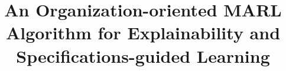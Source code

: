 \documentclass[runningheads]{llncs}
\begin{document}
\title{An Organization-oriented MARL Algorithm for Explainability and Specifications-guided Learning}
%
%

\author{}
\authorrunning{}
\institute{}


\maketitle              %

\end{document}
